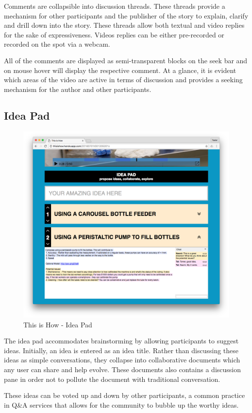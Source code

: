 Comments are collapsible into discussion threads. These threads provide a mechanism for other participants and the publisher of the story to explain, clarify and drill down into the story. These threads allow both textual and video replies for the sake of expressiveness. Videos replies can be either pre-recorded or recorded on the spot via a webcam. 


All of the comments are displayed as semi-transparent blocks on the seek bar and on mouse hover will display the respective comment. At a glance, it is evident which areas of the video are active in terms of discussion and provides a seeking mechanism for the author and other participants.  

\subsection{Idea Pad}

   \begin{figure}[thpb]
      \centering
      \includegraphics[width=\textwidth]{figures/ideapad-collapsed.png}
      \caption{This is How - Idea Pad}
      \label{fig_comment_thread}
   \end{figure}

The idea pad accommodates brainstorming by allowing participants to suggest ideas. Initially, an idea is entered as an idea title. Rather than discussing these ideas as simple conversations, they collapse into collaborative documents which any user can share and help evolve. These documents also contains a discussion pane in order not to pollute the document with traditional conversation. 

These ideas can be voted up and down by other participants, a common practice in Q\&A services\cite{stackoverflow}\cite{quora} that allows for the community to bubble up the worthy ideas.   